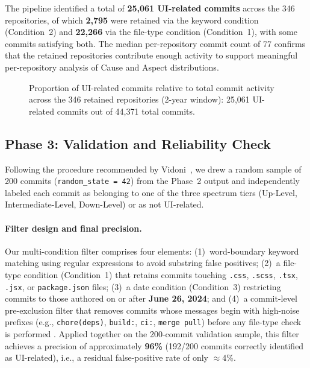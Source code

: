 \documentclass{article}
\begin{document}
The pipeline identified a total of \textbf{25,061 UI-related
commits} across the 346 repositories, of which \textbf{2,795}
were retained via the keyword condition (Condition~2) and
\textbf{22,266} via the file-type condition (Condition~1), with
some commits satisfying both. The median per-repository commit
count of 77 confirms that the retained repositories contribute
enough activity to support meaningful per-repository analysis of
Cause and Aspect distributions.

\begin{figure}[htbp]
\centering
{}
\caption{Proportion of UI-related commits relative to total commit
activity across the 346 retained repositories (2-year window):
25,061 UI-related commits out of 44,371 total commits.}
\label{fig:total_vs_ui_pie}
\end{figure}
\newpage
\subsection{Phase 3: Validation and Reliability Check}

Following the procedure recommended by Vidoni~\cite{vidoni2022systematic},
we drew a random sample of 200 commits (\texttt{random\_state = 42}) from
the Phase~2 output and independently labeled each commit as belonging to
one of the three spectrum tiers (Up-Level, Intermediate-Level, Down-Level)
or as not UI-related.

\paragraph{Filter design and final precision.}
Our multi-condition filter comprises four elements: (1)~word-boundary
keyword matching using regular expressions to avoid substring false
positives; (2)~a file-type condition (Condition~1) that retains commits
touching \texttt{.css}, \texttt{.scss}, \texttt{.tsx}, \texttt{.jsx}, or
\texttt{package.json} files; (3)~a date condition (Condition~3)
restricting commits to those authored on or after \textbf{June 26,
2024}; and (4)~a commit-level pre-exclusion filter that removes commits
whose messages begin with high-noise prefixes (e.g.,
\texttt{chore(deps)}, \texttt{build:}, \texttt{ci:}, \texttt{merge pull})
before any file-type check is performed \cite{herzig2013, levin2017}.
Applied together on the 200-commit validation sample, this filter
achieves a precision of approximately \textbf{96\%} (192/200
commits correctly identified as UI-related), i.e., a residual
false-positive rate of only $\approx$4\%.
\end{document}
